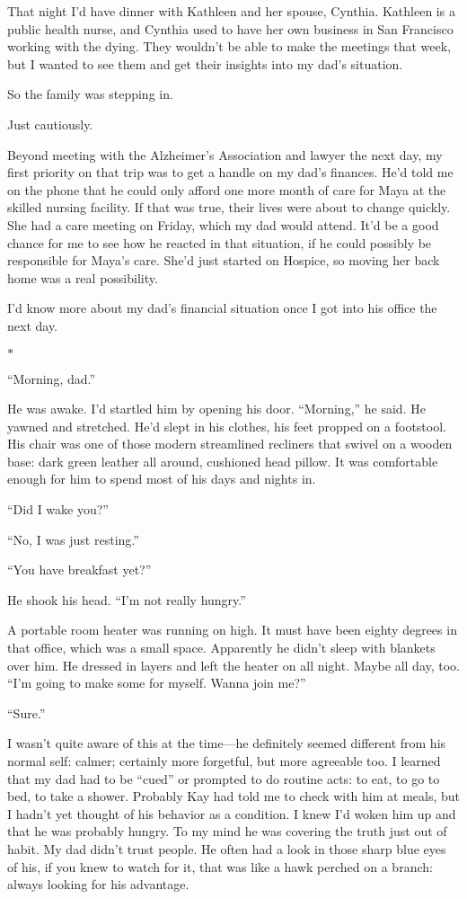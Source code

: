 \documentclass[12pt]{book}
\begin{document}
That night I'd have dinner with Kathleen and her spouse, Cynthia. Kathleen is a public health nurse, and Cynthia used to have her own business in San Francisco working with the dying. They wouldn't be able to make the meetings that week, but I wanted to see them and get their insights into my dad's situation.

So the family was stepping in.

Just cautiously.

Beyond meeting with the Alzheimer's Association and lawyer the next day, my first priority on that trip was to get a handle on my dad's finances. He'd told me on the phone that he could only afford one more month of care for Maya at the skilled nursing facility. If that was true, their lives were about to change quickly. She had a care meeting on Friday, which my dad would attend. It'd be a good chance for me to see how he reacted in that situation, if he could possibly be responsible for Maya's care. She'd just started on Hospice, so moving her back home was a real possibility.

I'd know more about my dad's financial situation once I got into his office the next day.

\begin{center}$*$\end{center}

``Morning, dad.''

He was awake. I'd startled him by opening his door. ``Morning,'' he said. He yawned and stretched. He'd slept in his clothes, his feet propped on a footstool. His chair was one of those modern streamlined recliners that swivel on a wooden base: dark green leather all around, cushioned head pillow. It was comfortable enough for him to spend most of his days and nights in.

``Did I wake you?''

``No, I was just resting.''

``You have breakfast yet?''

He shook his head. ``I'm not really hungry.''

A portable room heater was running on high. It must have been eighty degrees in that office, which was a small space. Apparently he didn't sleep with blankets over him. He dressed in layers and left the heater on all night. Maybe all day, too. ``I'm going to make some for myself. Wanna join me?''

``Sure.''

I wasn't quite aware of this at the time---he definitely seemed different from his normal self: calmer; certainly more forgetful, but more agreeable too. I learned that my dad had to be ``cued'' or prompted to do routine acts: to eat, to go to bed, to take a shower. Probably Kay had told me to check with him at meals, but I hadn't yet thought of his behavior as a condition. I knew I'd woken him up and that he was probably hungry. To my mind he was covering the truth just out of habit. My dad didn't trust people. He often had a look in those sharp blue eyes of his, if you knew to watch for it, that was like a hawk perched on a branch: always looking for his advantage.
\end{document}
